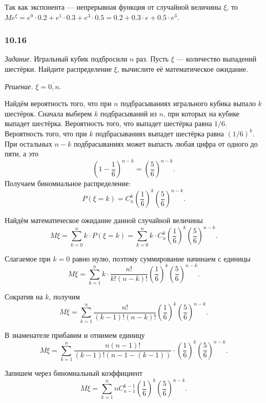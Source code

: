 Так как экспонента --- непрерывная функция от случайной величины $ \xi $, то $Me^{ \xi } = e^0 \cdot 0.2 + e^1 \cdot 0.3 + e^3 \cdot 0.5 = 0.2 + 0.3 \cdot e + 0.5 \cdot e^3$.

\subsubsection*{10.16}

\textit{Задание.} Игральный кубик подбросили $n$ раз.
Пусть $ \xi $ --- количество выпадений шестёрки.
Найдите распределение $ \xi $, вычислите её математическое ожидание.

\textit{Решение.} $ \xi = \overline{0, n}$.

Найдём вероятность того, что при $n$ подбрасываниях игрального кубика выпало $k$ шестёрок.
Сначала выберем $k$ подбрасываний из $n$, при которых на кубике выпадет шестёрка.
Вероятность того, что выпадет шестёрка равна $1/6$.
Вероятность того, что при $k$ подбрасываниях выпадет шестёрка равна $ \left( 1/6 \right)^k$.
При остальных $n - k$ подбрасываниях может выпасть любая цифра от одного до пяти, а это
$$ \left( 1 - \frac{1}{6} \right)^{n-k} =
\left( \frac{5}{6} \right)^{n-k}.$$
Получаем биномиальное распределение:
$$P \left( \xi = k \right) =
C_n^k \left( \frac{1}{6} \right)^k \left( \frac{5}{6} \right)^{n-k}.$$

Найдём математическое ожидание данной случайной величины
$$M \xi =
\sum \limits_{k=0}^n k \cdot P \left( \xi = k \right) =
\sum \limits_{k=0}^n k \cdot C_n^k \left( \frac{1}{6} \right)^k \left( \frac{5}{6} \right)^{n-k}.$$

Слагаемое при $k = 0$ равно нулю, поэтому суммирование начинаем с единицы
$$M \xi =
\sum \limits_{k=1}^n k \cdot \frac{n!}{k! \left( n-k \right)!} \left( \frac{1}{6} \right)^k \left( \frac{5}{6} \right)^{n-k}.$$

Сократив на $k$, получим
$$M \xi =
\sum \limits_{k=1}^n \frac{n!}{ \left( k-1 \right)! \left( n-k \right)! } \left( \frac{1}{6} \right)^k \left( \frac{5}{6} \right)^{n-k}.$$

В знаменателе прибавим и отнимем единицу
$$M \xi =
\sum \limits_{k=1}^n \frac{n \left( n-1 \right)!}{ \left( k-1 \right)! \left( n - 1 - \left( k-1 \right) \right) } \cdot
\left( \frac{1}{6} \right)^k \left( \frac{5}{6} \right)^{n-k}.$$

Запишем через биномиальный коэффициент
$$M \xi =
\sum \limits_{k=1}^n nC_{n-1}^{k-1} \left( \frac{1}{6} \right)^k \left( \frac{5}{6} \right)^{n-k}.$$

